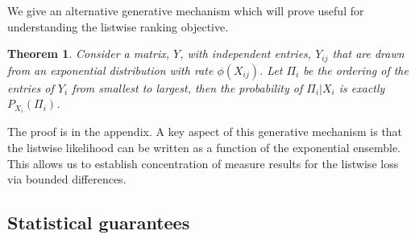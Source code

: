 \documentclass{article}
\newtheorem{theorem}{Theorem}
\begin{document}
We give an alternative generative mechanism which will prove useful for understanding the listwise ranking objective.
\begin{theorem}
\label{thm:gen}
Consider a matrix, $Y$, with independent entries, $Y_{ij}$ that are drawn from an exponential distribution with rate $\phi(X_{ij})$.
Let $\Pi_i$ be the ordering of the entries of $Y_i$ from smallest to largest, then the probability of $\Pi_i | X_i$ is exactly $P_{X_i}(\Pi_i)$.
\end{theorem}

The proof is in the appendix. A key aspect of this generative mechanism is that the listwise likelihood can be written as a function of the exponential ensemble.
This allows us to establish concentration of measure results for the listwise loss via bounded differences.

\subsection{Statistical guarantees}
\end{document}
